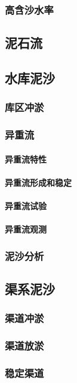 \documentclass[UTF8]{../../ApplicationUniverse}
\begin{document}
        \subsubsection{高含沙水率}
    \subsection{泥石流}
    \subsection{水库泥沙}
        \subsubsection{库区冲淤}
        \subsubsection{异重流}
            \paragraph{异重流特性}
            \paragraph{异重流形成和稳定}
            \paragraph{异重流试验}
            \paragraph{异重流观测}
        \subsubsection{泥沙分析}
    \subsection{渠系泥沙}
        \subsubsection{渠道冲淤}
        \subsubsection{渠道放淤}
        \subsubsection{稳定渠道}
\end{document}

